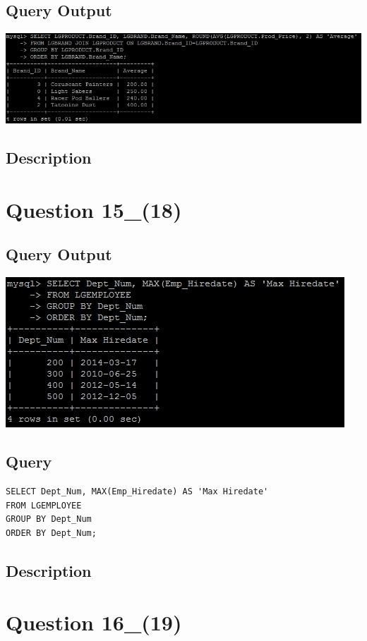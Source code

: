 \documentclass[a4paper,10pt]{article}
\begin{document}
\subsection{Query Output}
           \includegraphics{Queries/Question_14_(17)/Q14_screenshot.jpg}
\subsection{Description}
\section*{Question 15_(18)}
\subsection{Query Output}
           \includegraphics{Queries/Question_15_(18)/Q15_screenshot.jpg}
 \subsection{Query}
          \lstset{
            language=SQL,
            breaklines=true
            }
        \begin{lstlisting}[frame=single]
        SELECT Dept_Num, MAX(Emp_Hiredate) AS 'Max Hiredate'
FROM LGEMPLOYEE
GROUP BY Dept_Num
ORDER BY Dept_Num;

        \end{lstlisting}
\subsection{Description}
\section*{Question 16_(19)}
\end{document}
